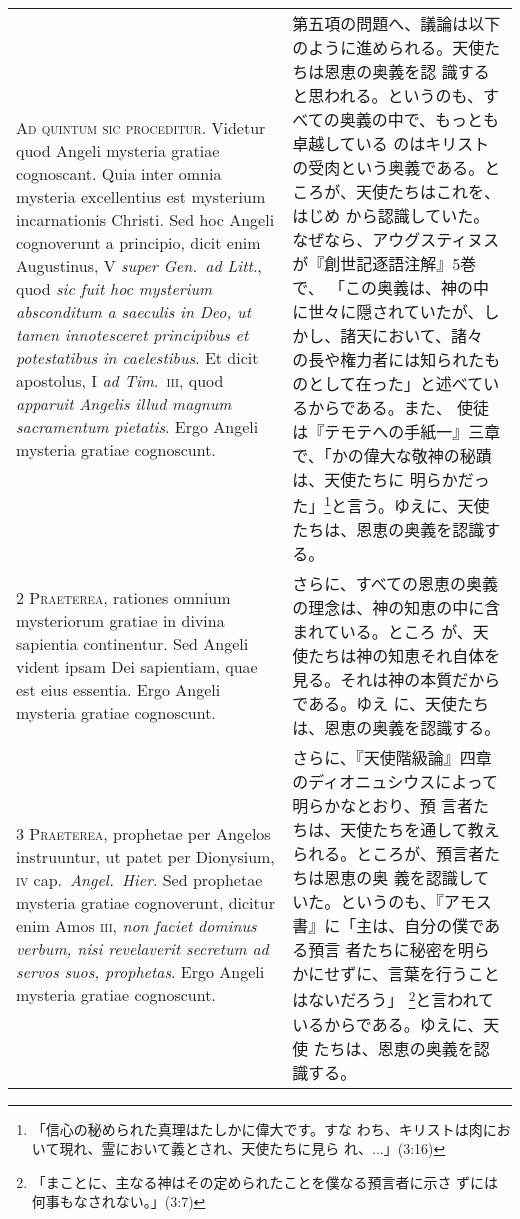 \documentclass[10pt]{jsarticle} %
\begin{document}
\begin{longtable}{p{21em}p{21em}}
{\huge A}{\scshape d quintum sic proceditur}. Videtur quod Angeli
mysteria gratiae cognoscant. Quia inter omnia mysteria excellentius
est mysterium incarnationis Christi. Sed hoc Angeli cognoverunt a
principio, dicit enim Augustinus, V {\itshape super Gen.~ad Litt}.,
quod {\itshape sic fuit hoc mysterium absconditum a saeculis in Deo,
ut tamen innotesceret principibus et potestatibus in caelestibus}. Et
dicit apostolus, I {\itshape ad Tim}.~{\scshape iii}, quod {\itshape
apparuit Angelis illud magnum sacramentum pietatis}. Ergo Angeli
mysteria gratiae cognoscunt.

&

第五項の問題へ、議論は以下のように進められる。天使たちは恩恵の奥義を認
識すると思われる。というのも、すべての奥義の中で、もっとも卓越している
のはキリストの受肉という奥義である。ところが、天使たちはこれを、はじめ
から認識していた。なぜなら、アウグスティヌスが『創世記逐語注解』5巻で、
「この奥義は、神の中に世々に隠されていたが、しかし、諸天において、諸々
の長や権力者には知られたものとして在った」と述べているからである。また、
使徒は『テモテへの手紙一』三章で、「かの偉大な敬神の秘蹟は、天使たちに
明らかだった」\footnote{「信心の秘められた真理はたしかに偉大です。すな
わち、キリストは肉において現れ、霊において義とされ、天使たちに見ら
れ、...」(3:16)}と言う。ゆえに、天使たちは、恩恵の奥義を認識する。


\\


{\scshape 2 Praeterea}, rationes omnium mysteriorum gratiae in divina
sapientia continentur. Sed Angeli vident ipsam Dei sapientiam, quae
est eius essentia. Ergo Angeli mysteria gratiae cognoscunt.


&

さらに、すべての恩恵の奥義の理念は、神の知恵の中に含まれている。ところ
が、天使たちは神の知恵それ自体を見る。それは神の本質だからである。ゆえ
に、天使たちは、恩恵の奥義を認識する。

\\


{\scshape 3 Praeterea}, prophetae per Angelos instruuntur, ut patet
per Dionysium, {\scshape iv} cap.~{\itshape Angel.~Hier}. Sed
prophetae mysteria gratiae cognoverunt, dicitur enim Amos {\scshape
iii}, {\itshape non faciet dominus verbum, nisi revelaverit secretum
ad servos suos, prophetas}. Ergo Angeli mysteria gratiae cognoscunt.


&


さらに、『天使階級論』四章のディオニュシウスによって明らかなとおり、預
言者たちは、天使たちを通して教えられる。ところが、預言者たちは恩恵の奥
義を認識していた。というのも、『アモス書』に「主は、自分の僕である預言
者たちに秘密を明らかにせずに、言葉を行うことはないだろう」
\footnote{「まことに、主なる神はその定められたことを僕なる預言者に示さ
ずには何事もなされない。」(3:7)}と言われているからである。ゆえに、天使
たちは、恩恵の奥義を認識する。


\end{longtable}
\end{document}
